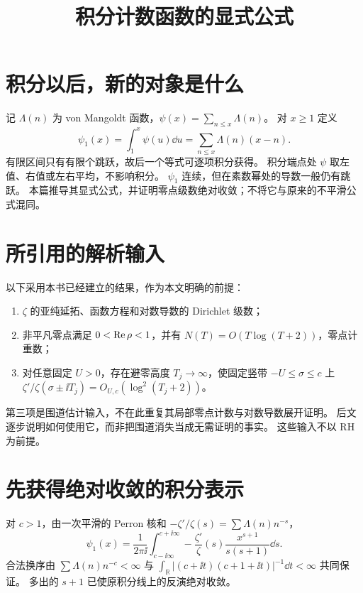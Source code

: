 \documentclass[UTF8,fontset=fandol,11pt]{ctexart}
\title{积分计数函数的显式公式}
\begin{document}
\maketitle
\draftnotice
\section{积分以后，新的对象是什么}
记 $\Lambda(n)$ 为 von Mangoldt 函数，$\psi(x)=\sum_{n\le x}\Lambda(n)$。
对 $x\ge1$ 定义
\[
 \psi_1(x)=\int_1^x\psi(u)\dd u
 =\sum_{n\le x}\Lambda(n)(x-n).
\]
有限区间只有有限个跳跃，故后一个等式可逐项积分获得。
积分端点处 $\psi$ 取左值、右值或左右平均，不影响积分。
$\psi_1$ 连续，但在素数幂处的导数一般仍有跳跃。
本篇推导其显式公式，并证明零点级数绝对收敛；不将它与原来的不平滑公式混同。

\section{所引用的解析输入}
以下采用本书已经建立的结果，作为本文明确的前提：
\begin{enumerate}
 \item $\zeta$ 的亚纯延拓、函数方程和对数导数的 Dirichlet 级数；
 \item 非平凡零点满足 $0<\operatorname{Re}\rho<1$，并有 $N(T)=O(T\log(T+2))$，零点计重数；
 \item 对任意固定 $U>0$，存在避零高度 $T_j\to\infty$，使固定竖带
 $-U\le\sigma\le c$ 上 $\zeta'/\zeta(\sigma\pm\ii T_j)
 =O_{U,c}(\log^2(T_j+2))$。
\end{enumerate}
第三项是围道估计输入，不在此重复其局部零点计数与对数导数展开证明。
后文逐步说明如何使用它，而非把围道消失当成无需证明的事实。
这些输入不以 RH 为前提。

\section{先获得绝对收敛的积分表示}
对 $c>1$，由一次平滑的 Perron 核和
$-\zeta'/\zeta(s)=\sum\Lambda(n)n^{-s}$，
\[
 \psi_1(x)=\frac1{2\pi\ii}\int_{c-\ii\infty}^{c+\ii\infty}
 -\frac{\zeta'}{\zeta}(s)\frac{x^{s+1}}{s(s+1)}\dd s.       \tag{1}
\]
合法换序由
$\sum\Lambda(n)n^{-c}<\infty$ 与
$\int_{\mathbb R}|(c+\ii t)(c+1+\ii t)|^{-1}\dd t<\infty$
共同保证。
多出的 $s+1$ 已使原积分线上的反演绝对收敛。

\end{document}
